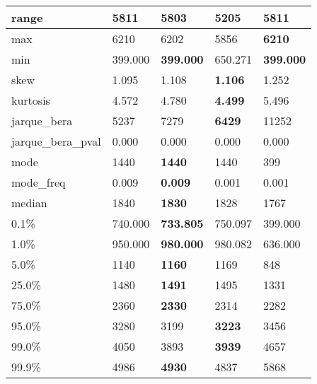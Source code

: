 \begin{table}[H]
\begin{tabular}{|l|m{10em}|m{10em}|m{10em}|m{10em}|}
\hline range & 5811 & 5803 & \cellcolor[rgb]{0.9, 0.54, 0.52} 5205 & \bfseries 5811 \\
\hline max & 6210 & 6202 & \cellcolor[rgb]{0.9, 0.54, 0.52} 5856 & \bfseries 6210 \\
\hline min & 399.000 & \bfseries 399.000 & \cellcolor[rgb]{0.9, 0.54, 0.52} 650.271 & \bfseries 399.000 \\
\hline skew & 1.095 & 1.108 & \bfseries 1.106 & \cellcolor[rgb]{0.9, 0.54, 0.52} 1.252 \\
\hline kurtosis & 4.572 & 4.780 & \bfseries 4.499 & \cellcolor[rgb]{0.9, 0.54, 0.52} 5.496 \\
\hline jarque\_bera & 5237 & 7279 & \bfseries 6429 & \cellcolor[rgb]{0.9, 0.54, 0.52} 11252 \\
\hline jarque\_bera\_pval & 0.000 & 0.000 & 0.000 & 0.000 \\
\hline mode & 1440 & \bfseries 1440 & 1440 & \cellcolor[rgb]{0.9, 0.54, 0.52} 399 \\
\hline mode\_freq & 0.009 & \bfseries 0.009 & \cellcolor[rgb]{0.9, 0.54, 0.52} 0.001 & 0.001 \\
\hline median & 1840 & \bfseries 1830 & 1828 & \cellcolor[rgb]{0.9, 0.54, 0.52} 1767 \\
\hline 0.1\% & 740.000 & \bfseries 733.805 & 750.097 & \cellcolor[rgb]{0.9, 0.54, 0.52} 399.000 \\
\hline 1.0\% & 950.000 & \bfseries 980.000 & 980.082 & \cellcolor[rgb]{0.9, 0.54, 0.52} 636.000 \\
\hline 5.0\% & 1140 & \bfseries 1160 & 1169 & \cellcolor[rgb]{0.9, 0.54, 0.52} 848 \\
\hline 25.0\% & 1480 & \bfseries 1491 & 1495 & \cellcolor[rgb]{0.9, 0.54, 0.52} 1331 \\
\hline 75.0\% & 2360 & \bfseries 2330 & 2314 & \cellcolor[rgb]{0.9, 0.54, 0.52} 2282 \\
\hline 95.0\% & 3280 & 3199 & \bfseries 3223 & \cellcolor[rgb]{0.9, 0.54, 0.52} 3456 \\
\hline 99.0\% & 4050 & 3893 & \bfseries 3939 & \cellcolor[rgb]{0.9, 0.54, 0.52} 4657 \\
\hline 99.9\% & 4986 & \bfseries 4930 & 4837 & \cellcolor[rgb]{0.9, 0.54, 0.52} 5868 \\
\hline
\end{tabular}
\end{table}
